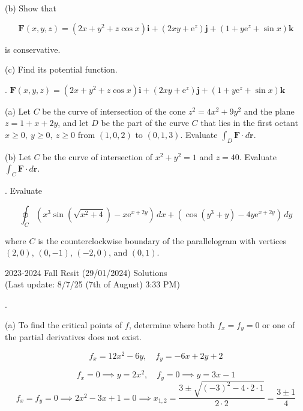 \documentclass{article}
\begin{document}
\hfill

\noindent (b) Show that

\[\mathbf{F}(x,y,z)=\left(2x+y^2+z\cos x\right)\mathbf{i}+\left(2xy+\mathrm{e}^z\right)\mathbf{j}+\left(1+y\mathrm{e}^z+\sin x\right)\mathbf{k}\]

\hfill

\noindent is conservative.

\hfill

\noindent (c) Find its potential function.

\newpage

. $\mathbf{F}(x,y,z)=\left(2x+y^2+z\cos x\right)\mathbf{i}+\left(2xy+\mathrm{e}^z\right)\mathbf{j}+\left(1+y\mathrm{e}^z+\sin x\right)\mathbf{k}$

\hfill

\noindent (a) Let $C $ be the curve of intersection of the cone $z^2=4x^2+9y^2$ and the plane $z=1+x+2y$, and let $D$ be the part of the curve $C$ that lies in the first octant $x\geq0,\:y\geq0,\:z\geq0$ from $(1,0,2)$ to $(0,1,3)$. Evaluate $\int_D\mathbf{F}\cdot d\mathbf{r}$.

\hfill

\noindent (b) Let $C$ be the curve of intersection of $x^2+y^2=1$ and $z=40$. Evaluate $\int_C\mathbf{F}\cdot d\mathbf{r}$.

\hfill

. Evaluate

\[\oint_C\left(x^3\sin\left(\sqrt{x^2+4}\right)-x\mathrm{e}^{x+2y}\right)\,dx + \left(\cos\left(y^3+y\right)-4y\mathrm{e}^{x+2y}\right)\,dy\]

\hfill

\noindent where $C$ is the counterclockwise boundary of the parallelogram with vertices $(2,0)$, $(0,-1)$, $(-2,0)$, and $(0,1)$.

\newpage

\begin{center}
2023-2024 Fall Resit (29/01/2024) Solutions\\
(Last update: 8/7/25 (7th of August) 3:33 PM)
\end{center}

.

\hfill

\noindent (a) To find the critical points of $f$, determine where both $f_x=f_y=0$ or one of the partial derivatives does not exist.

\[f_x=12x^2-6y,\quad f_y=-6x+2y+2\]

\[f_x=0\implies y=2x^2,\quad f_y=0\implies y=3x-1\]
\[f_x=f_y=0\implies 2x^2-3x+1=0\implies x_{1,2}=\frac{3\pm\sqrt{(-3)^2-4\cdot2\cdot 1}}{2\cdot2}=\frac{3\pm1}{4}\]
\end{document}
